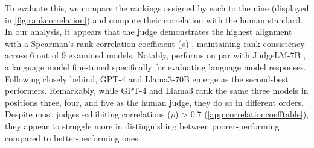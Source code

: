 To evaluate this, we compare the rankings assigned by each \judgemodels to the nine \evaluatormodels (displayed in \cref{fig:rankcorrelation}) and compute their correlation with the human standard. 
In our analysis, it appears that the  judge demonstrates the highest alignment with a Spearman's rank correlation coefficient ($\rho$) \citep{spearman1904spearman}, maintaining rank consistency across 6 out of 9 examined models. 
Notably,  performs on par with JudgeLM-7B \citep{zhu2023judgelm}, a language model fine-tuned specifically for evaluating language model responses. 
Following closely behind, GPT-4 and Llama3-70B emerge as the second-best performers. 
Remarkably, while GPT-4 and Llama3 rank the same three models in positions three, four, and five as the human judge, they do so in different orders. 
Despite most judges exhibiting correlations ($\rho$) > 0.7 (\cref{app:correlationcoefftable}), they appear to struggle more in distinguishing between poorer-performing \evaluatormodels compared to better-performing ones.




